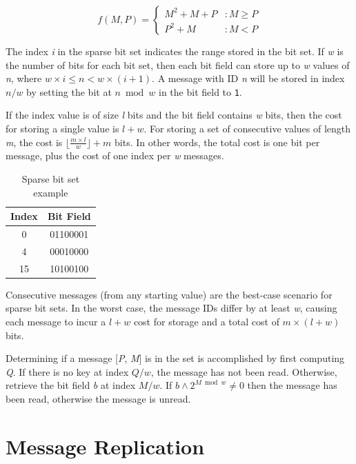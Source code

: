  \begin{equation}
   f(M,P) = \left\{
     \begin{array}{lr}
       M^{2} + M + P & : M \geq P \\
       P^{2} + M & : M < P
     \end{array}
   \right.
   \label{eq:elegantpairing}
\end{equation}

The index \textit{i} in the sparse bit set indicates the range stored in the bit set. If \textit{w} is the number of bits for each bit set, then each bit field can store up to \textit{w} values of \textit{n}, where $w \times i \leq n < w \times (i + 1)$. A message with ID \textit{n} will be stored in index $n/w$ by setting the bit at $n \bmod w$ in the bit field to \texttt{1}.

If the index value is of size \textit{l} bits and the bit field contains \textit{w} bits, then the cost for storing a single value is $l + w$. For storing a set of consecutive values of length \textit{m}, the cost is $\lfloor \frac{m \times l}{w} \rfloor + m$ bits. In other words, the total cost is one bit per message, plus the cost of one index per \textit{w} messages.

\begin{table}
\centering
\caption{Sparse bit set example}
\begin{tabular}{|c|c|} \hline
Index & Bit Field \\ \hline
0 & 01100001 \\ \hline
4 & 00010000 \\ \hline
15 & 10100100 \\ \hline
\end{tabular}
\label{fig:bitset}
\end{table}

Consecutive messages (from any starting value) are the best-case scenario for sparse bit sets. In the worst case, the message IDs differ by at least \textit{w}, causing each message to incur a $l + w$ cost for storage and a total cost of $m \times (l + w)$ bits.

Determining if a message [\textit{P}, \textit{M}] is in the set is accomplished by first computing \textit{Q}. If there is no key at index $Q/w$, the message has not been read. Otherwise, retrieve the bit field \textit{b} at index $M / w$. If $b \wedge 2^{M \bmod w} \neq 0$ then the message has been read, otherwise the message is unread.

\section{Message Replication}\label{sec:replication}


